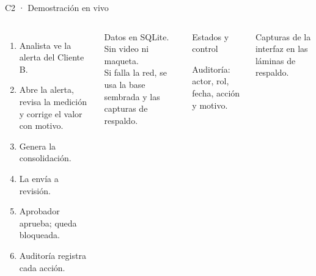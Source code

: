 \documentclass[aspectratio=169,10pt]{beamer}
\begin{document}
\begin{frame}{C2 · Demostración en vivo}
  \begin{columns}[T,onlytextwidth]
      \begin{enumerate}
        \item Analista ve la alerta del Cliente B.
        \item Abre la alerta, revisa la medición y corrige el valor con motivo.
        \item Genera la consolidación.
        \item La envía a revisión.
        \item Aprobador aprueba; queda bloqueada.
        \item Auditoría registra cada acción.
      \end{enumerate}
      \vspace{1mm}
      {\scriptsize Datos en SQLite. Sin video ni maqueta.\\
      Si falla la red, se usa la base sembrada y las capturas de respaldo.}
      \begin{block}{Estados y control}
        \centering
        \vspace{1mm}

        {\tiny Auditoría: actor, rol, fecha, acción y motivo.}
      \end{block}
      {\scriptsize Capturas de la interfaz en las láminas de respaldo.}
  \end{columns}
\end{frame}
\end{document}
